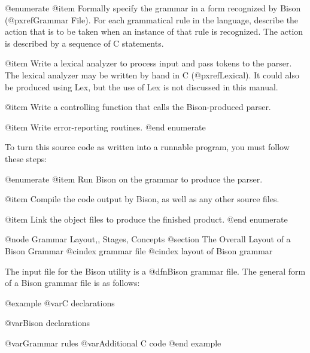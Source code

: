 @enumerate
@item
Formally specify the grammar in a form recognized by Bison
(@pxref{Grammar File}).  For each grammatical rule in the language,
describe the action that is to be taken when an instance of that rule
is recognized.  The action is described by a sequence of C statements.

@item
Write a lexical analyzer to process input and pass tokens to the
parser.  The lexical analyzer may be written by hand in C
(@pxref{Lexical}).  It could also be produced using Lex, but the use
of Lex is not discussed in this manual.

@item
Write a controlling function that calls the Bison-produced parser.

@item
Write error-reporting routines.
@end enumerate

To turn this source code as written into a runnable program, you
must follow these steps:

@enumerate
@item
Run Bison on the grammar to produce the parser.

@item
Compile the code output by Bison, as well as any other source files.

@item
Link the object files to produce the finished product.
@end enumerate

@node Grammar Layout,, Stages, Concepts
@section The Overall Layout of a Bison Grammar
@cindex grammar file
@cindex layout of Bison grammar

The input file for the Bison utility is a @dfn{Bison grammar file}.  The
general form of a Bison grammar file is as follows:

@example
@var{C declarations}

@var{Bison declarations}

@var{Grammar rules}
@var{Additional C code}
@end example

